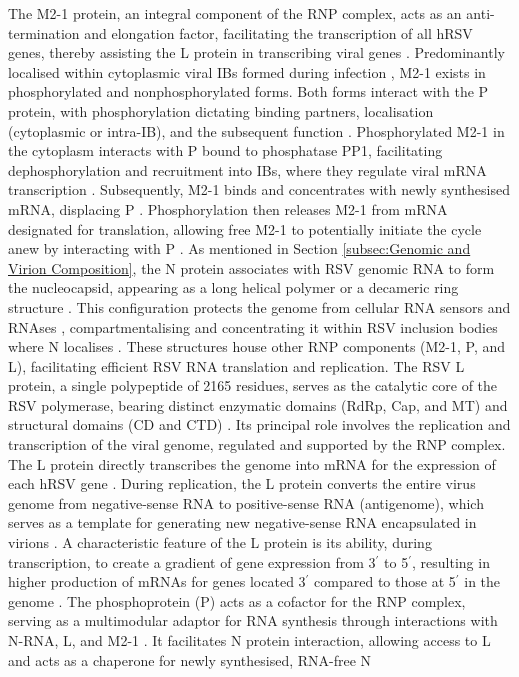 The M2-1 protein, an integral component of the RNP complex, acts as an anti-termination and elongation factor, facilitating the transcription of all hRSV genes, thereby assisting the L protein in transcribing viral genes \cite{Collins1996TranscriptionVirus., Noton2015InitiationReplication}. Predominantly localised within cytoplasmic viral IBs formed during infection \cite{Rincheval2017FunctionalVirus}, M2-1 exists in phosphorylated and nonphosphorylated forms. Both forms interact with the P protein, with phosphorylation dictating binding partners, localisation (cytoplasmic or intra-IB), and the subsequent function \cite{Richard2018RSVTranscription}. Phosphorylated M2-1 in the cytoplasm interacts with P bound to phosphatase PP1, facilitating dephosphorylation and recruitment into IBs, where they regulate viral mRNA transcription \cite{Richard2018RSVTranscription}. Subsequently, M2-1 binds and concentrates with newly synthesised mRNA, displacing P \cite{Blondot2012StructureProtein.}. Phosphorylation then releases M2-1 from mRNA designated for translation, allowing free M2-1 to potentially initiate the cycle anew by interacting with P \cite{Richard2018RSVTranscription}. As mentioned in Section \ref{subsec:Genomic and Virion Composition}, the N protein associates with RSV genomic RNA to form the nucleocapsid, appearing as a long helical polymer or a decameric ring structure \cite{Gonnin2023StructuralNucleocapsids}. This configuration protects the genome from cellular RNA sensors and RNAses \cite{Tawar2009CrystalVirus}, compartmentalising and concentrating it within RSV inclusion bodies where N localises \cite{Rincheval2017FunctionalVirus}. These structures house other RNP components (M2-1, P, and L), facilitating efficient RSV RNA translation and replication. The RSV L protein, a single polypeptide of 2165 residues, serves as the catalytic core of the RSV polymerase, bearing distinct enzymatic domains (RdRp, Cap, and MT) and structural domains (CD and CTD) \cite{Gilman2019StructureComplex, Cao2020Cryo-EMPolymerase}. Its principal role involves the replication and transcription of the viral genome, regulated and supported by the RNP complex. The L protein directly transcribes the genome into mRNA for the expression of each hRSV gene \cite{Cowton2006UnravellingSynthesis, Noton2015InitiationReplication}. During replication, the L protein converts the entire virus genome from negative-sense RNA to positive-sense RNA (antigenome), which serves as a template for generating new negative-sense RNA encapsulated in virions \cite{Cowton2006UnravellingSynthesis, Fearns2000FunctionalVirus}. A characteristic feature of the L protein is its ability, during transcription, to create a gradient of gene expression from 3$^{\prime}$ to 5$^{\prime}$, resulting in higher production of mRNAs for genes located 3$^{\prime}$ compared to those at 5$^{\prime}$ in the genome \cite{Hardy1998TheTranscription, Kuo1996TheMinigenome}. The phosphoprotein (P) acts as a cofactor for the RNP complex, serving as a multimodular adaptor for RNA synthesis through interactions with N-RNA, L, and M2-1 \cite{Blondot2012StructureProtein., Cardone2021APhosphoprotein}. It facilitates N protein interaction, allowing access to L \cite{Sourimant2015FinePhosphoprotein} and acts as a chaperone for newly synthesised, RNA-free N 